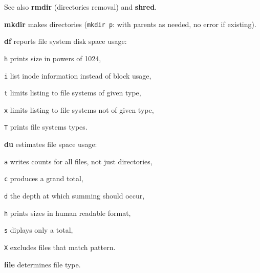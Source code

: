 \begin{enumx}
	\item [\cmdblack] See also \textbf{rmdir} (directories removal) and \textbf{shred}.

	\item [\cmdblack] \textbf{mkdir} makes directories 
	(\texttt{mkdir p}: with parents as needed, no error if existing).
\end{enumx}

\begin{enumx}
	\item [\cmdblack] \textbf{df} reports file system disk space usage:
	\item [\texttt{h}] prints size in powers of 1024,
	\item [\texttt{i}] list inode information instead of block usage,
	\item [\texttt{t}] limits listing to file systems of given type,
	\item [\texttt{x}] limits listing to file systems not of given type,
	\item [\texttt{T}] prints file systems types.
	
	\item [\cmdblack] \textbf{du} estimates file space usage:
	\item [\texttt{a}] writes counts for all files, not just directories,
	\item [\texttt{c}] produces a grand total,
	\item [\texttt{d}] the depth at which summing should occur,
	\item [\texttt{h}] prints sizes in human readable format,
	\item [\texttt{s}] diplays only a total,
	\item [\texttt{X}] excludes files that match pattern.
\end{enumx}

\begin{enumx}
	\item [\cmd] \textbf{file} determines file type.
\end{enumx}

